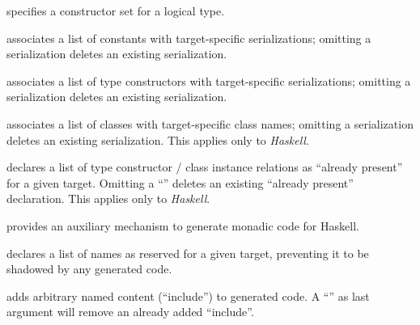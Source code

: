 \begin{isabellebody}
\begin{isamarkuptext}
\begin{description}
  \item \hyperlink{command.HOL.code-datatype}{\mbox{}} specifies a constructor set
  for a logical type.

  \item \hyperlink{command.HOL.code-const}{\mbox{}} associates a list of constants
  with target-specific serializations; omitting a serialization
  deletes an existing serialization.

  \item \hyperlink{command.HOL.code-type}{\mbox{}} associates a list of type
  constructors with target-specific serializations; omitting a
  serialization deletes an existing serialization.

  \item \hyperlink{command.HOL.code-class}{\mbox{}} associates a list of classes
  with target-specific class names; omitting a serialization deletes
  an existing serialization.  This applies only to \emph{Haskell}.

  \item \hyperlink{command.HOL.code-instance}{\mbox{}} declares a list of type
  constructor / class instance relations as ``already present'' for a
  given target.  Omitting a ``\isa{{\isachardoublequote}{\isacharminus}{\isachardoublequote}}'' deletes an existing
  ``already present'' declaration.  This applies only to
  \emph{Haskell}.

  \item \hyperlink{command.HOL.code-monad}{\mbox{}} provides an auxiliary mechanism
  to generate monadic code for Haskell.

  \item \hyperlink{command.HOL.code-reserved}{\mbox{}} declares a list of names as
  reserved for a given target, preventing it to be shadowed by any
  generated code.

  \item \hyperlink{command.HOL.code-include}{\mbox{}} adds arbitrary named content
  (``include'') to generated code.  A ``\isa{{\isachardoublequote}{\isacharminus}{\isachardoublequote}}'' as last argument
  will remove an already added ``include''.


\end{description}
\end{isamarkuptext}
\end{isabellebody}
